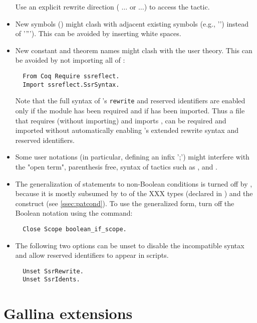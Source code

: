 \begin{itemize}
Use an explicit rewrite direction ( $\dots$ or  $\dots$)
to access the \Coq{}  tactic.
\item New symbols (\ssrC{//, /=, //=}) might clash with adjacent existing
  symbols (e.g., '\ssrC{//}') instead of '\ssrC{/}''\ssrC{/}'). This can be avoided
  by inserting white spaces.
\item New constant and theorem names might clash with the user
theory. This can be avoided by not importing all of \ssr{}:
\begin{lstlisting}
  From Coq Require ssreflect.
  Import ssreflect.SsrSyntax.
\end{lstlisting}
Note that the full syntax of \ssr{}'s {\tt rewrite} and reserved identifiers are
enabled only if the  module has been required and if
 has been imported. Thus a file that requires (without importing)
  and imports , can be
required and imported without automatically enabling \ssr{}'s
extended rewrite syntax and reserved identifiers.
\item Some user notations (in particular, defining an infix ';') might
interfere with the "open term", parenthesis free, syntax of tactics
such as ,  and .
\item The generalization of  statements to non-Boolean
conditions is turned off by \ssr{}, because it is mostly subsumed by
 to  of the XXX types (declared in
)
and the  {\term}    {\term}  {\term} construct (see
\ref{ssec:patcond}). To use the generalized form, turn off the \ssr{}
Boolean  notation using the command:
\begin{lstlisting}
  Close Scope boolean_if_scope.
\end{lstlisting}
\item The following two options can be unset to disable the
      incompatible  syntax and allow
      reserved identifiers to appear in scripts.
\begin{lstlisting}
  Unset SsrRewrite.
  Unset SsrIdents.
\end{lstlisting}
\end{itemize}

\section{Gallina extensions}

